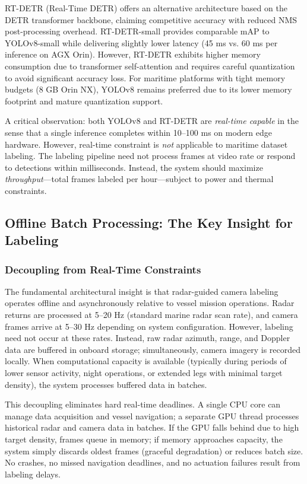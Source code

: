 RT-DETR (Real-Time DETR) \cite{Zhang2024RT-DETRYOLOv8Comparison} offers an alternative architecture based on the DETR transformer backbone, claiming competitive accuracy with reduced NMS post-processing overhead. RT-DETR-small provides comparable mAP to YOLOv8-small while delivering slightly lower latency (45 ms vs. 60 ms per inference on AGX Orin). However, RT-DETR exhibits higher memory consumption due to transformer self-attention and requires careful quantization to avoid significant accuracy loss. For maritime platforms with tight memory budgets (8 GB Orin NX), YOLOv8 remains preferred due to its lower memory footprint and mature quantization support.

A critical observation: both YOLOv8 and RT-DETR are \emph{real-time capable} in the sense that a single inference completes within 10--100 ms on modern edge hardware. However, real-time constraint is \emph{not} applicable to maritime dataset labeling. The labeling pipeline need not process frames at video rate or respond to detections within milliseconds. Instead, the system should maximize \emph{throughput}---total frames labeled per hour---subject to power and thermal constraints.



\subsection{Offline Batch Processing: The Key Insight for Labeling}

\subsubsection{Decoupling from Real-Time Constraints}

The fundamental architectural insight is that radar-guided camera labeling operates offline and asynchronously relative to vessel mission operations. Radar returns are processed at 5--20 Hz (standard marine radar scan rate), and camera frames arrive at 5--30 Hz depending on system configuration. However, labeling need not occur at these rates. Instead, raw radar azimuth, range, and Doppler data are buffered in onboard storage; simultaneously, camera imagery is recorded locally. When computational capacity is available (typically during periods of lower sensor activity, night operations, or extended legs with minimal target density), the system processes buffered data in batches.

This decoupling eliminates hard real-time deadlines. A single CPU core can manage data acquisition and vessel navigation; a separate GPU thread processes historical radar and camera data in batches. If the GPU falls behind due to high target density, frames queue in memory; if memory approaches capacity, the system simply discards oldest frames (graceful degradation) or reduces batch size. No crashes, no missed navigation deadlines, and no actuation failures result from labeling delays.

